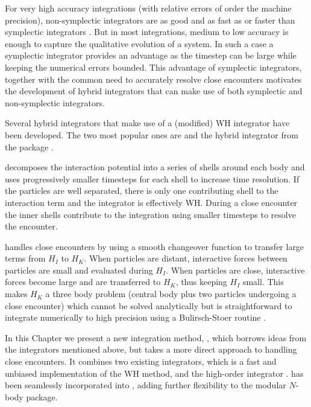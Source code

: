 For very high accuracy integrations (with relative errors of order the machine precision), non-symplectic integrators are as good and as fast as or faster than symplectic integrators \citep{Rein2015a}.
But in most integrations, medium to low accuracy is enough to capture the qualitative evolution of a system. 
In such a case a symplectic integrator provides an advantage as the timestep can be large while keeping the numerical errors bounded.
This advantage of symplectic integrators, together with the common need to accurately resolve close encounters motivates the development of hybrid integrators that can make use of both symplectic and non-symplectic integrators.

Several hybrid integrators that make use of a (modified) WH integrator have been developed. 
The two most popular ones are \symba \citep{Duncan1998} and the hybrid integrator from the \mercury package \citep[hereafter referred to as \mercury]{Chambers1999}.

\symba decomposes the interaction potential into a series of shells around each body and uses progressively smaller timesteps for each shell to increase time resolution.
If the particles are well separated, there is only one contributing shell to the interaction term and the integrator is effectively WH.
During a close encounter the inner shells contribute to the integration using smaller timesteps to resolve the encounter.

\mercury handles close encounters by using a smooth changeover function to transfer large terms from $H_I$ to $H_K$. 
When particles are distant, interactive forces between particles are small and evaluated during $H_I$. 
When particles are close, interactive forces become large and are transferred to $H_K$, thus keeping $H_I$ small. 
This makes $H_K$ a three body problem (central body plus two particles undergoing a close encounter) which cannot be solved analytically but is straightforward to integrate numerically to high precision using a Bulirsch-Stoer routine \citep{BS1988}. 
 
In this Chapter we present a new integration method, \hermes, which borrows ideas from the integrators mentioned above, but takes a more direct approach to handling close encounters.
It combines two existing integrators, \whfast \citep{Rein2015b} 
 which is a fast and unbiased implementation of the WH method, and the high-order \ias integrator \citep{Rein2015a}. 
\hermes has been seamlessly incorporated into \reb \citep{Rein2012}, adding further flexibility to the modular $N$-body package. 

